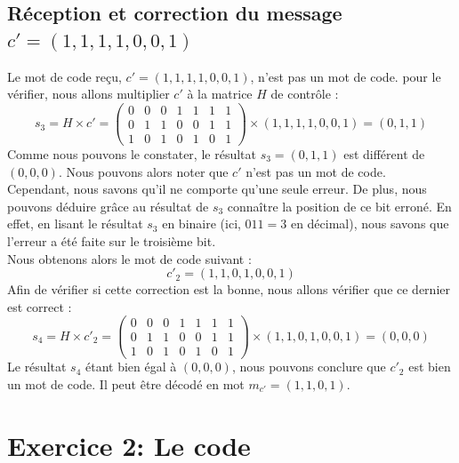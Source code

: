 \subsection{Réception et correction du message $c'=(1,1,1,1,0,0,1)$}
Le mot de code reçu, $c'=(1,1,1,1,0,0,1)$, n'est pas un mot de code. pour le vérifier, nous allons multiplier $c'$ à la matrice $H$ de contrôle :
\begin{equation}
 s_3=H\times c'=
  \begin{pmatrix}
  0 & 0 & 0 & 1 & 1 & 1 & 1 \\
  0 & 1 & 1 & 0 & 0 & 1 & 1 \\
  1 & 0 & 1 & 0 & 1 & 0 & 1
 \end{pmatrix}
 \times(1,1,1,1,0,0,1)=(0,1,1)
\end{equation}
Comme nous pouvons le constater, le résultat $s_3=(0,1,1)$ est différent de $(0,0,0)$. Nous pouvons alors noter que $c'$ n'est pas un mot de code. \\
Cependant, nous savons qu'il ne comporte qu'une seule erreur. De plus, nous pouvons déduire grâce au résultat de $s_3$ connaître la position de ce bit erroné. En effet, en lisant le résultat $s_3$ en binaire (ici, $011=3$ en décimal), nous savons que l'erreur a été faite sur le troisième bit.\\
Nous obtenons alors le mot de code suivant :
\begin{equation}
 c'_2=(1,1,0,1,0,0,1)
\end{equation}
Afin de vérifier si cette correction est la bonne, nous allons vérifier que ce dernier est correct : 
\begin{equation}
 s_4=H\times c'_2=
  \begin{pmatrix}
  0 & 0 & 0 & 1 & 1 & 1 & 1 \\
  0 & 1 & 1 & 0 & 0 & 1 & 1 \\
  1 & 0 & 1 & 0 & 1 & 0 & 1
 \end{pmatrix}
 \times(1,1,0,1,0,0,1)=(0,0,0)
\end{equation}
Le résultat $s_4$ étant bien égal à $(0,0,0)$, nous pouvons conclure que $c'_2$ est bien un mot de code. Il peut être décodé en mot $m_{c'}=(1,1,0,1)$.


\section{Exercice 2: Le code}

